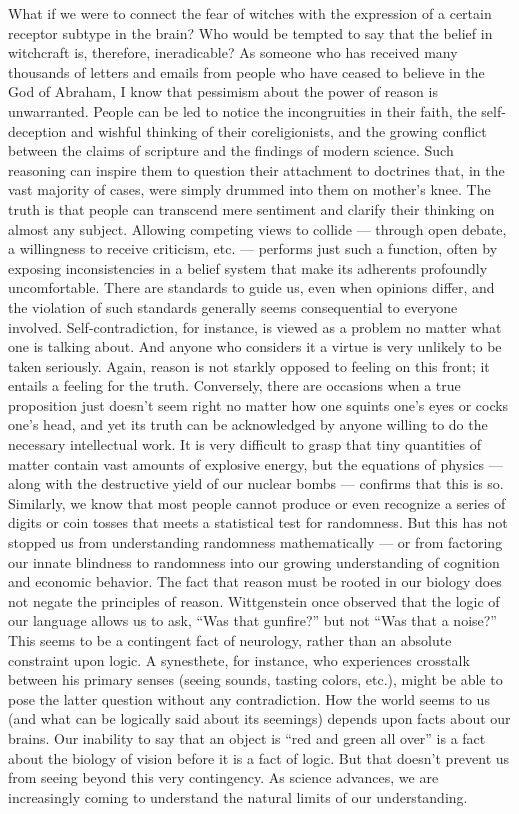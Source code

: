 \documentclass[a4paper,14pt]{extbook}
\begin{document}
What if we were to connect the fear of witches with the expression of a certain receptor subtype in the brain?
Who would be tempted to say that the belief in witchcraft is, therefore, ineradicable?
As someone who has received many thousands of letters and emails from people who have ceased to believe in the God of Abraham, I know that pessimism about the power of reason is unwarranted.
People can be led to notice the incongruities in their faith, the self-deception and wishful thinking of their coreligionists, and the growing conflict between the claims of scripture and the findings of modern science.
Such reasoning can inspire them to question their attachment to doctrines that, in the vast majority of cases, were simply drummed into them on mother’s knee.
The truth is that people can transcend mere sentiment and clarify their thinking on almost any subject.
Allowing competing views to collide --- through open debate, a willingness to receive criticism, etc. --- performs just such a function, often by exposing inconsistencies in a belief system that make its adherents profoundly uncomfortable.
There are standards to guide us, even when opinions differ, and the violation of such standards generally seems consequential to everyone involved.
Self-contradiction, for instance, is viewed as a problem no matter what one is talking about.
And anyone who considers it a virtue is very unlikely to be taken seriously.
Again, reason is not starkly opposed to feeling on this front;
it entails a feeling for the truth.
Conversely, there are occasions when a true proposition just doesn’t seem right no matter how one squints one’s eyes or cocks one’s head, and yet its truth can be acknowledged by anyone willing to do the necessary intellectual work.
It is very difficult to grasp that tiny quantities of matter contain vast amounts of explosive energy, but the equations of physics --- along with the destructive yield of our nuclear bombs --- confirms that this is so.
Similarly, we know that most people cannot produce or even recognize a series of digits or coin tosses that meets a statistical test for randomness.
But this has not stopped us from understanding randomness mathematically --- or from factoring our innate blindness to randomness into our growing understanding of cognition and economic behavior.
The fact that reason must be rooted in our biology does not negate the principles of reason.
Wittgenstein once observed that the logic of our language allows us to ask, ``Was that gunfire?'' but not ``Was that a noise?''
This seems to be a contingent fact of neurology, rather than an absolute constraint upon logic.
A synesthete, for instance, who experiences crosstalk between his primary senses (seeing sounds, tasting colors, etc.), might be able to pose the latter question without any contradiction.
How the world seems to us (and what can be logically said about its seemings) depends upon facts about our brains.
Our inability to say that an object is ``red and green all over'' is a fact about the biology of vision before it is a fact of logic.
But that doesn’t prevent us from seeing beyond this very contingency.
As science advances, we are increasingly coming to understand the natural limits of our understanding.
\end{document}
